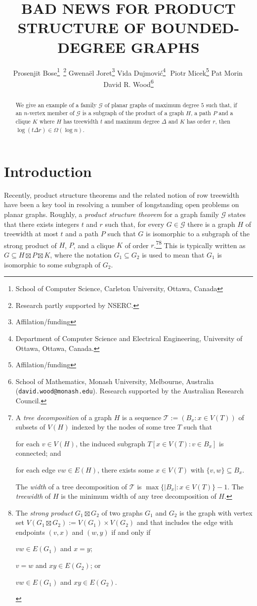 \documentclass{patmorin}
\title{\MakeUppercase{Bad News for Product Structure of Bounded-Degree Graphs}}
\author{%
  Prosenjit Bose\thanks{School of Computer Science, Carleton University, Ottawa, Canada}\, \thanks{Research partly supported by NSERC.} \quad
  Gwenaël Joret\thanks{Affilation/funding} \quad
  Vida Dujmović\thanks{Department of Computer Science and Electrical Engineering, University of Ottawa, Ottawa, Canada.}\,\, \footnotemark[2] \quad
  Piotr Micek\thanks{Affilation/funding}\quad
  Pat Morin\footnotemark[1]\, \footnotemark[2] \quad
  David R. Wood\thanks{School of Mathematics, Monash University, Melbourne, Australia (\texttt{david.wood@monash.edu}). Research supported by the Australian Research Council.}
}
\date{}
\newcommand{\defin}[1]{\emph{\color{brightmaroon}#1}}
\begin{document}
\maketitle
\renewcommand{\E}{\mathbb{E}}
\renewcommand{\Pr}{\mathbb{P}}

\begin{abstract}
  We give an example of a family $\mathcal{G}$ of planar graphs of maximum degree $5$ such that, if an $n$-vertex member of $\mathcal{G}$ is a subgraph of the product of a graph $H$, a path $P$ and a clique $K$ where $H$ has treewidth $t$ and maximum degree $\Delta$ and $K$ has order $r$, then $\log(t\Delta r) \in \Omega(\log n)$.
\end{abstract}

\section{Introduction}

Recently, product structure theorems and the related notion of row treewidth have been a key tool in resolving a number of longstanding open problems on planar graphs.  Roughly, a \defin{product structure theorem} for a graph family $\mathcal{G}$ states that there exists integers $t$ and $r$ such that, for every $G\in\mathcal{G}$ there is a graph $H$ of treewidth at most $t$ and a path $P$ such that $G$ is isomorphic to a subgraph of the strong product of $H$, $P$, and a clique $K$ of order $r$.\footnote{A \defin{tree decomposition} of a graph $H$ is a sequence $\mathcal{T}:=(B_x:x\in V(T))$ of subsets of $V(H)$ indexed by the nodes of some tree $T$ such that
\begin{inparaenum}[(i)]
  \item for each $v\in V(H)$, the induced subgraph $T[x\in V(T):v\in B_x]$ is connected; and
  \item for each edge $vw\in E(H)$, there exists some $x\in V(T)$ with $\{v,w\}\subseteq B_x$.
\end{inparaenum}
The \defin{width} of a tree decomposition of $\mathcal{T}$ is $\max\{|B_x|:x\in V(T)\}-1$. The \defin{treewidth} of $H$ is the minimum width of any tree decomposition of $H$.}\footnote{The \defin{strong product} $G_1\boxtimes G_2$ of two graphs $G_1$ and $G_2$ is the graph with vertex set $V(G_1\boxtimes G_2):=V(G_1)\times V(G_2)$ and that includes the edge with endpoints $(v,x)$ and $(w,y)$ if and only if
\begin{inparaenum}[(i)]
  \item $vw\in E(G_1)$ and $x=y$;
  \item $v=w$ and $xy\in E(G_2)$; or
  \item $vw\in E(G_1)$ and $xy\in E(G_2)$.
\end{inparaenum}
}
This is typically written as $G\subseteq H\boxtimes P\boxtimes K$, where the notation $G_1\subseteq G_2$ is used to mean that $G_1$ is isomorphic to some subgraph of $G_2$.
\end{document}
